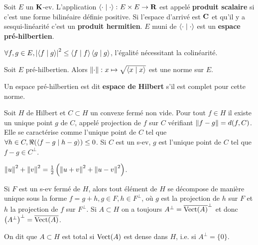 \begin{defn}
	Soit $E$ un $\mathbf{K}$-ev.
	L'application $\left\langle \cdot \mid \cdot \right\rangle \colon E \times E \to \mathbf{R}$ est appelé \textbf{produit scalaire} si c'est une forme bilinéaire définie positive.
	Si l'espace d'arrivé est $\mathbf{C}$ et qu'il y a sesqui-linéarité c'est un \textbf{produit hermitien}.
	$E$ muni de $\left\langle \cdot \mid \cdot \right\rangle$ est un \textbf{espace pré-hilbertien}.
\end{defn}

\begin{pop}
	$\forall f,g \in E, \left\lvert\left\langle f \mid g \right\rangle\right\rvert^2 \leq \left\langle f \mid f \right\rangle \left\langle g \mid g \right\rangle$, l'égalité nécessitant la colinéarité.
\end{pop}

\begin{pop}
	Soit $E$ pré-hilbertien.
	Alors $\left\lVert\cdot\right\rVert \colon x \mapsto \sqrt{\left\langle x \mid x \right\rangle}$ est une norme sur $E$.
\end{pop}

\begin{defn}
	Un espace pré-hilbertien est dit \textbf{espace de Hilbert} s'il est complet pour cette norme.
\end{defn}

\begin{thm}
	Soit $H$ de Hilbert et $C \subset H$ un convexe fermé non vide.
	Pour tout $f \in H$ il existe un unique point $g$ de $C$, appelé projection de $f$ sur $C$ vérifiant $\left\lVert f - g\right\rVert = d(f,C)$.
	Elle se caractérise comme l'unique point de $C$ tel que $\forall h \in C, \Re(\left\langle f - g \mid h - g \right\rangle) \leq 0$.
	Si $C$ est un s-ev, $g$ est l'unique point de $C$ tel que $f - g \in C^\perp$.
\end{thm}

\begin{lem}
	$\left\lVert u\right\rVert^2 + \left\lVert v\right\rVert^2 = \frac{1}{2} \left( \left\lVert u + v\right\rVert^2 + \left\lVert u - v\right\rVert^2 \right)$.
\end{lem}

\begin{pop}
	Si $F$ est un s-ev fermé de $H$, alors tout élément de $H$ se décompose de manière unique sous la forme $f = g + h, g \in F, h \in F^\perp$, où $g$ est la projection de $h$ sur $F$ et $h$ la projection de $f$ sur $F^\perp$.
	Si $A \subset H$ on a toujours $A^\perp = \overline{\operatorname{Vect}(A)}^\perp$ et donc $\left( A^\perp \right)^\perp = \overline{\operatorname{Vect}(A)}$.
\end{pop}

\begin{defn}
	On dit que $A \subset H$ est total si $\operatorname{Vect}(A)$ est dense dans $H$, i.e. si $A^\perp = \{ 0 \}$.
\end{defn}

